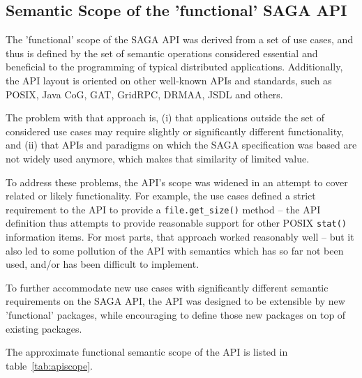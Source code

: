 \documentclass[a4paper,12pt]{article}
\newcommand{\T}[1]{\texttt{#1}}
\begin{document}
 
 \subsection{Semantic Scope of the 'functional' SAGA API}

  The 'functional' scope of the SAGA API was derived from a set of use
  cases, and thus is defined by the set of semantic operations
  considered essential and beneficial to the programming of typical
  distributed applications.  Additionally, the API layout is oriented
  on other well-known APIs and standards, such as POSIX, Java CoG,
  GAT, GridRPC, DRMAA, JSDL and others.

  The problem with that approach is, (i) that applications outside the
  set of considered use cases may require slightly or significantly
  different functionality, and (ii) that APIs and paradigms on which
  the SAGA specification was based are not widely used anymore, which
  makes that similarity of limited value.

  To address these problems, the API's scope was widened in an attempt
  to cover related or likely functionality.  For example, the use
  cases defined a strict requirement to the API to provide a
  \T{file.get\_size()} method -- the API definition thus attempts to
  provide reasonable support for other POSIX \T{stat()} information
  items.  For most parts, that approach worked reasonably well -- but
  it also led to some pollution of the API with semantics which has so
  far not been used, and/or has been difficult to implement.

  To further accommodate new use cases with significantly different
  semantic requirements on the SAGA API, the API was designed to be
  extensible by new 'functional' packages, while encouraging to define
  those new packages on top of existing packages.

  The approximate functional semantic scope of the API is listed in
  table~\ref{tab:apiscope}.
\end{document}
